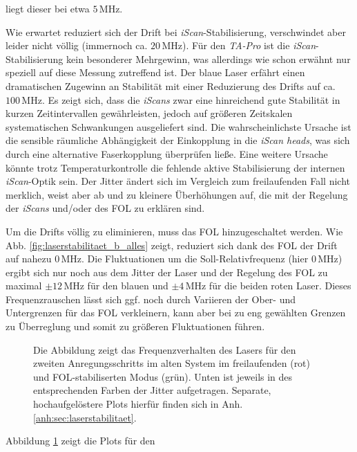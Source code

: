 liegt dieser bei etwa $5\,$MHz.\par
Wie erwartet reduziert sich der Drift bei \textit{iScan}-Stabilisierung,
verschwindet aber leider nicht völlig (immernoch ca. $20\,$MHz). Für den \textit{TA-Pro} ist die
\textit{iScan}-Stabilisierung kein besonderer Mehrgewinn, was allerdings wie
schon erwähnt nur speziell auf diese Messung zutreffend ist. Der blaue Laser
erfährt einen dramatischen Zugewinn an Stabilität mit einer Reduzierung des
Drifts auf ca. $100\,$MHz. Es zeigt sich, dass die \textit{iScans} zwar
eine hinreichend gute Stabilität in kurzen Zeitintervallen gewährleisten, jedoch
auf größeren Zeitskalen systematischen Schwankungen ausgeliefert sind. Die
wahrscheinlichste Ursache ist die sensible räumliche Abhängigkeit der
Einkopplung in die \textit{iScan heads}, was sich durch eine alternative
Faserkopplung überprüfen ließe. Eine weitere Ursache könnte trotz
Temperaturkontrolle die fehlende aktive Stabilisierung der internen \textit{iScan}-Optik sein. Der
Jitter ändert sich im Vergleich zum freilaufenden Fall nicht merklich,
weist aber ab und zu kleinere Überhöhungen auf, die mit der Regelung der
\textit{iScans} und/oder des FOL zu erklären sind.\par
Um die Drifts völlig zu eliminieren, muss das FOL hinzugeschaltet werden. Wie
Abb. \ref{fig:laserstabilitaet_b_alles} zeigt, reduziert sich
dank des FOL der Drift auf nahezu $0\,$MHz. Die Fluktuationen um die
Soll-Relativfrequenz (hier $0\,$MHz) ergibt sich nur noch aus dem Jitter der
Laser und der Regelung des FOL zu maximal $\pm12\,$MHz für den blauen und
$\pm4\,$MHz für die beiden roten Laser. Dieses Frequenzrauschen lässt sich ggf.
noch durch Variieren der Ober- und Untergrenzen für das FOL verkleinern, kann aber bei zu eng
gewählten Grenzen zu Überreglung und somit zu größeren Fluktuationen führen.\par
\begin{figure}[h]
 	\centering
 	\footnotesize
	
	\caption[Laserfrequenzverhalten altes System]{Die Abbildung zeigt das
	Frequenzverhalten des Lasers für den zweiten Anregungsschritts im alten System
	im freilaufenden (rot) und FOL-stabiliserten Modus (grün).
	Unten ist jeweils in des entsprechenden Farben der Jitter aufgetragen.
	Separate, hochaufgelöstere Plots hierfür finden sich in Anh.
	\ref{anh:sec:laserstabilitaet}.}
	\label{fig:laserstabilitaet_alt_alles}
\end{figure}
Abbildung \ref{fig:laserstabilitaet_alt_alles} zeigt die Plots für den

